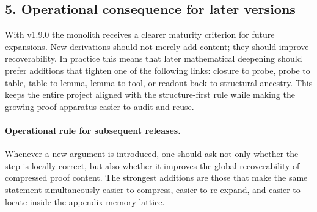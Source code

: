 \subsection*{5. Operational consequence for later versions}
With v1.9.0 the monolith receives a clearer maturity criterion for future
expansions. New derivations should not merely add content; they should improve
recoverability. In practice this means that later mathematical deepening should
prefer additions that tighten one of the following links: closure to probe,
probe to table, table to lemma, lemma to tool, or readout back to structural
ancestry. This keeps the entire project aligned with the structure-first rule
while making the growing proof apparatus easier to audit and reuse.

\paragraph{Operational rule for subsequent releases.}
Whenever a new argument is introduced, one should ask not only whether the step
is locally correct, but also whether it improves the global recoverability of
compressed proof content. The strongest additions are those that make the same
statement simultaneously easier to compress, easier to re-expand, and easier to
locate inside the appendix memory lattice.




